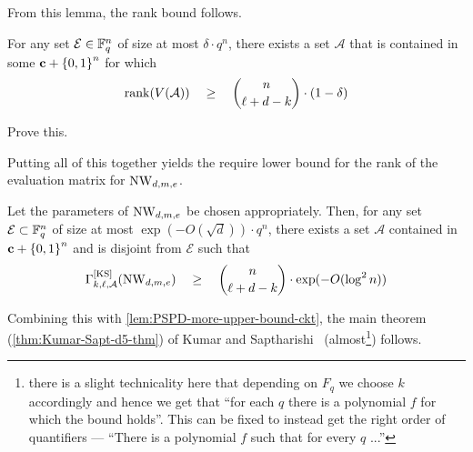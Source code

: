 From this lemma, the rank bound follows. 

\begin{lemma}
For any set $\mathcal{E} \in \mathbb{F}_q^n$ of size at most $\delta \cdot q^n$, there exists a set $\mathcal{A}$ that is contained in some $\mathbf{c} + \left\{0,1\right\}^n$ for which 
\[
\operatorname{rank}(V(\mathcal{A})) \quad \geq \quad \binom{n}{\ell + d - k} \cdot (1 - \delta)
\] 
\end{lemma}
\begin{exercise}
Prove this. 
\end{exercise}

Putting all of this together yields the require lower bound for the rank of the evaluation matrix for $\operatorname{\mathrm{NW}}_{d,m,e}$. 

\begin{lemma}
Let the parameters of $\operatorname{\mathrm{NW}}_{d,m,e}$ be chosen appropriately. Then, for any set $\mathcal{E} \subset \mathbb{F}_q^n$ of size at most $\exp(-O(\sqrt{d})) \cdot q^n$, there exists a set $\mathcal{A}$ contained in $\mathbf{c} + \left\{0,1\right\}^n$ and is disjoint from $\mathcal{E}$ such that
\[
\Gamma^{\mathrm{[KS]}}_{k,\ell,\mathcal{A}}(\operatorname{\mathrm{NW}}_{d,m,e}) \quad \geq \quad \binom{n}{\ell + d - k} \cdot \exp(-O(\log^2 n))
\]
\end{lemma}

Combining this with \ref{lem:PSPD-more-upper-bound-ckt}, the main theorem (\autoref{thm:Kumar-Sapt-d5-thm}) of Kumar and Saptharishi~\cite{KumarSapt15} (almost\footnote{there is a slight technicality here that depending on $F_q$ we choose $k$ accordingly and hence we get that ``for each $q$ there is a polynomial $f$ for which the bound holds''. This can be fixed to instead get the right order of quantifiers --- ``There is a polynomial $f$ such that for every $q$ ...''}) follows. 


